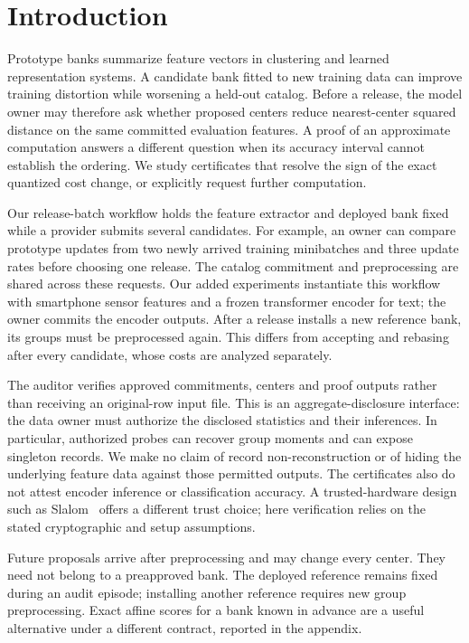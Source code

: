 \section{Introduction}
Prototype banks summarize feature vectors in clustering and learned
representation systems. A candidate bank fitted to new training data can
improve training distortion while worsening a held-out catalog. Before a
release, the model owner may therefore ask whether proposed centers reduce
nearest-center squared distance on the same committed evaluation features.
A proof of an approximate computation answers a different question when
its accuracy interval cannot establish the ordering. We study certificates
that resolve the sign of the exact quantized cost change, or explicitly
request further computation.

Our release-batch workflow holds the feature extractor and deployed bank
fixed while a provider submits several candidates. For example, an owner
can compare prototype updates from two newly arrived training minibatches
and three update rates before choosing one release. The catalog commitment
and preprocessing are shared across these requests. Our added experiments
instantiate this workflow with smartphone sensor features and a frozen
transformer encoder for text; the owner commits the encoder outputs.
After a release installs a new reference bank, its groups must be
preprocessed again. This differs from accepting and rebasing after every
candidate, whose costs are analyzed separately.

The auditor verifies approved commitments, centers and proof outputs rather
than receiving an original-row input file. This is an aggregate-disclosure
interface: the data owner must authorize the disclosed statistics and their
inferences. In particular, authorized probes can recover group moments and
can expose singleton records. We make no claim of record non-reconstruction
or of hiding the underlying feature data against those permitted outputs.
The certificates also do not attest encoder inference or classification
accuracy. A trusted-hardware design such as Slalom~\cite{tramer2019slalom}
offers a different trust choice; here verification relies on the stated
cryptographic and setup assumptions.

Future proposals arrive after preprocessing and may change every center.
They need not belong to a preapproved bank. The deployed reference remains
fixed during an audit episode; installing another reference requires new
group preprocessing. Exact affine scores for a bank known in advance are a
useful alternative under a different contract, reported in the appendix.

